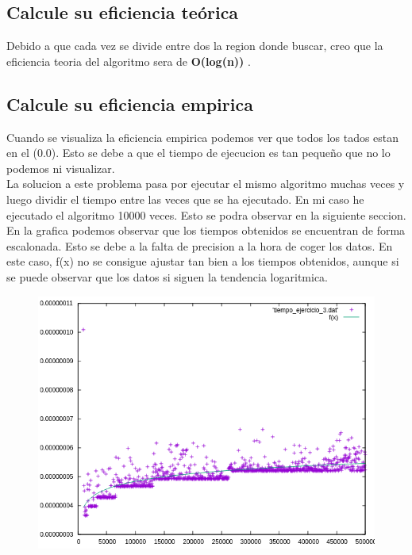 \documentclass[12pt,a4psprt]{article}
\begin{document}
\subsection{Calcule su eficiencia teórica}
Debido a que cada vez  se divide entre dos la region donde buscar, creo que la eficiencia teoria del algoritmo sera de \textbf{O(log(n))} .

\subsection{Calcule su eficiencia empirica}
Cuando se visualiza la eficiencia empirica podemos ver que todos los tados estan en el (0.0). Esto se debe a que el tiempo de ejecucion es tan pequeño que no lo podemos ni visualizar.\\ 
La solucion a este problema pasa por ejecutar el mismo algoritmo muchas veces y luego dividir el tiempo entre las veces que se ha ejecutado. En mi caso he ejecutado el algoritmo 10000 veces. Esto se podra observar en la siguiente seccion.\\
En la grafica podemos observar que los tiempos obtenidos se encuentran de forma escalonada. Esto se debe a la falta de precision a la hora de coger los datos. En este caso, f(x) no se consigue ajustar tan bien a los tiempos obtenidos, aunque si se puede observar que los datos si siguen la tendencia logaritmica.
\begin{figure}[h]
\begin{center}
	\includegraphics[scale=1]{image/grafica_3.png}
\end{center}
\end{figure}
\pagebreak
\end{document}

